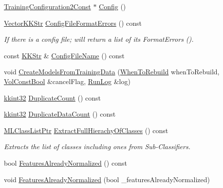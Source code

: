 \begin{DoxyCompactItemize}
\hyperlink{namespace_k_k_m_l_l_abec6237fd9c0112ff72b75b10d4b5696}{Training\+Configuration2\+Const} $\ast$ \hyperlink{class_k_k_m_l_l_1_1_training_process2_a1c03795f43796bf2090bb0e8b2fd81db}{Config} ()
\item 
\hyperlink{class_k_k_b_1_1_vector_k_k_str}{Vector\+K\+K\+Str} \hyperlink{class_k_k_m_l_l_1_1_training_process2_afc0d42e996db4251f6dfcaf25f1620c9}{Config\+File\+Format\+Errors} () const 
\begin{DoxyCompactList}\small\item\em If there is a config file; will return a list of its Format\+Errors (). \end{DoxyCompactList}\item 
const \hyperlink{class_k_k_b_1_1_k_k_str}{K\+K\+Str} \& \hyperlink{class_k_k_m_l_l_1_1_training_process2_a6692c410f62c041847697586b02ef6c4}{Config\+File\+Name} () const 
\item 
void \hyperlink{class_k_k_m_l_l_1_1_training_process2_ac7bcc1beaabb19bf98798a3bb9f039a8}{Create\+Models\+From\+Training\+Data} (\hyperlink{class_k_k_m_l_l_1_1_training_process2_acc48e76f6978c8c8c0c849eec2d0ee53}{When\+To\+Rebuild} when\+To\+Rebuild, \hyperlink{namespace_k_k_b_a7d390f568e2831fb76b86b56c87bf92f}{Vol\+Const\+Bool} \&cancel\+Flag, \hyperlink{class_k_k_b_1_1_run_log}{Run\+Log} \&log)
\item 
\hyperlink{namespace_k_k_b_a8fa4952cc84fda1de4bec1fbdd8d5b1b}{kkint32} \hyperlink{class_k_k_m_l_l_1_1_training_process2_ad78c98f37aacefd0b7de6e1acdb331d8}{Duplicate\+Count} () const 
\item 
\hyperlink{namespace_k_k_b_a8fa4952cc84fda1de4bec1fbdd8d5b1b}{kkint32} \hyperlink{class_k_k_m_l_l_1_1_training_process2_a69a0f63ad64d359a76c544f1f2b1bb8b}{Duplicate\+Data\+Count} () const 
\item 
\hyperlink{namespace_k_k_m_l_l_af091cde3f4a4315658b41a5e7583fc26}{M\+L\+Class\+List\+Ptr} \hyperlink{class_k_k_m_l_l_1_1_training_process2_af8d23bebe1647318bb248c98b4221ab7}{Extract\+Full\+Hierachy\+Of\+Classes} () const 
\begin{DoxyCompactList}\small\item\em Extracts the list of classes including ones from Sub-\/\+Classifiers. \end{DoxyCompactList}\item 
bool \hyperlink{class_k_k_m_l_l_1_1_training_process2_a258a13bc5acfd8f6b0eb5444ba8eef97}{Features\+Already\+Normalized} () const 
\item 
void \hyperlink{class_k_k_m_l_l_1_1_training_process2_a9227a0f86f8ab5369a50362df30e1d03}{Features\+Already\+Normalized} (bool \+\_\+features\+Already\+Normalized)

\end{DoxyCompactItemize}
